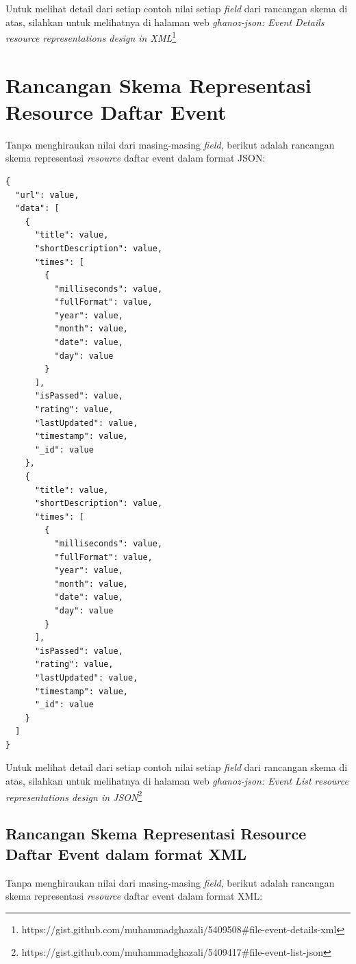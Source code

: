 \documentclass[a4paper, 12pt, oneside]{report}
\begin{document}
\onehalfspacing Untuk melihat detail dari setiap contoh nilai setiap \textit{field} dari rancangan skema di atas, silahkan untuk melihatnya di halaman web \textit{ghanoz-json: Event Details resource representations design in XML}\footnote{https://gist.github.com/muhammadghazali/5409508\#file-event-details-xml}

\section{Rancangan Skema Representasi Resource Daftar Event}

\onehalfspacing Tanpa menghiraukan nilai dari masing-masing \textit{field}, berikut adalah rancangan skema representasi \textit{resource} daftar event dalam format JSON:

\begin{lstlisting}[frame=single]
{
  "url": value,
  "data": [
    {
      "title": value,
      "shortDescription": value,
      "times": [
        {
          "milliseconds": value,
          "fullFormat": value,
          "year": value,
          "month": value,
          "date": value,
          "day": value
        }
      ],
      "isPassed": value,
      "rating": value,
      "lastUpdated": value,
      "timestamp": value,
      "_id": value
    },
    {
      "title": value,
      "shortDescription": value,
      "times": [
        {
          "milliseconds": value,
          "fullFormat": value,
          "year": value,
          "month": value,
          "date": value,
          "day": value
        }
      ],
      "isPassed": value,
      "rating": value,
      "lastUpdated": value,
      "timestamp": value,
      "_id": value
    }
  ]
}
\end{lstlisting}

\onehalfspacing Untuk melihat detail dari setiap contoh nilai setiap \textit{field} dari rancangan skema di atas, silahkan untuk melihatnya di halaman web \textit{ghanoz-json: Event List resource representations design in JSON}\footnote{https://gist.github.com/muhammadghazali/5409417\#file-event-list-json}

\subsection{Rancangan Skema Representasi Resource Daftar Event dalam format XML}
\onehalfspacing Tanpa menghiraukan nilai dari masing-masing \textit{field}, berikut adalah rancangan skema representasi \textit{resource} daftar event dalam format XML:
\end{document}
